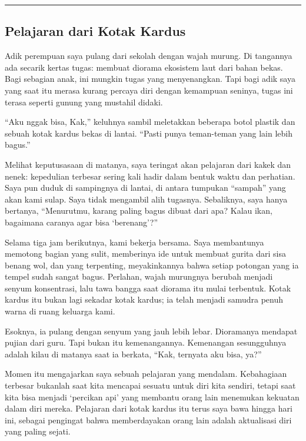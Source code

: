 \documentclass[
  letterpaper,
  DIV=11,
  numbers=noendperiod]{scrreprt}
\begin{document}
\begin{center}\rule{0.5\linewidth}{0.5pt}\end{center}

\subsection{Pelajaran dari Kotak
Kardus}\label{pelajaran-dari-kotak-kardus}

Adik perempuan saya pulang dari sekolah dengan wajah murung. Di
tangannya ada secarik kertas tugas: membuat diorama ekosistem laut dari
bahan bekas. Bagi sebagian anak, ini mungkin tugas yang menyenangkan.
Tapi bagi adik saya yang saat itu merasa kurang percaya diri dengan
kemampuan seninya, tugas ini terasa seperti gunung yang mustahil didaki.

``Aku nggak bisa, Kak,'' keluhnya sambil meletakkan beberapa botol
plastik dan sebuah kotak kardus bekas di lantai. ``Pasti punya
teman-teman yang lain lebih bagus.''

Melihat keputusasaan di matanya, saya teringat akan pelajaran dari kakek
dan nenek: kepedulian terbesar sering kali hadir dalam bentuk waktu dan
perhatian. Saya pun duduk di sampingnya di lantai, di antara tumpukan
``sampah'' yang akan kami sulap. Saya tidak mengambil alih tugasnya.
Sebaliknya, saya hanya bertanya, ``Menurutmu, karang paling bagus dibuat
dari apa? Kalau ikan, bagaimana caranya agar bisa `berenang'?''

Selama tiga jam berikutnya, kami bekerja bersama. Saya membantunya
memotong bagian yang sulit, memberinya ide untuk membuat gurita dari
sisa benang wol, dan yang terpenting, meyakinkannya bahwa setiap
potongan yang ia tempel sudah sangat bagus. Perlahan, wajah murungnya
berubah menjadi senyum konsentrasi, lalu tawa bangga saat diorama itu
mulai terbentuk. Kotak kardus itu bukan lagi sekadar kotak kardus; ia
telah menjadi samudra penuh warna di ruang keluarga kami.

Esoknya, ia pulang dengan senyum yang jauh lebih lebar. Dioramanya
mendapat pujian dari guru. Tapi bukan itu kemenangannya. Kemenangan
sesungguhnya adalah kilau di matanya saat ia berkata, ``Kak, ternyata
aku bisa, ya?''

Momen itu mengajarkan saya sebuah pelajaran yang mendalam. Kebahagiaan
terbesar bukanlah saat kita mencapai sesuatu untuk diri kita sendiri,
tetapi saat kita bisa menjadi `percikan api' yang membantu orang lain
menemukan kekuatan dalam diri mereka. Pelajaran dari kotak kardus itu
terus saya bawa hingga hari ini, sebagai pengingat bahwa memberdayakan
orang lain adalah aktualisasi diri yang paling sejati.
\end{document}
